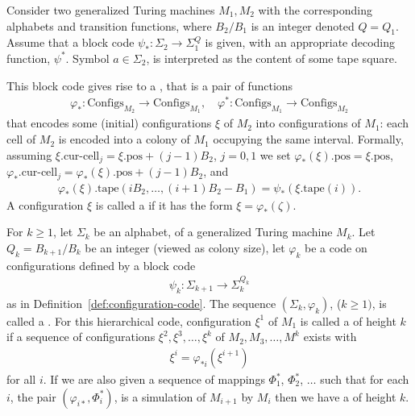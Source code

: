 \documentclass[11pt]{memoir}
\theoremstyle{definition} %
\renewcommand{\ge}{\geq}
\def\B{B}
\newcommand{\Configs}{\mathrm{Configs}}
\newcommand{\pos}{\mathrm{pos}}
\newcommand{\curcell}{\textrm{cur-cell}}
\newcommand{\Q}{Q} %
\newcommand{\tape}{\mathrm{tape}}
\begin{document}
\begin{definition}\label{def:configuration-code}
\begin{sloppypar}
 Consider two generalized Turing machines \( M_{1},M_{2} \) with the corresponding
alphabets and transition functions, where \( \B_{2}/\B_{1} \) is an integer denoted \( \Q=\Q_{1} \).
Assume that a block code
\(
   \psi_{*}:\Sigma_{2}\to\Sigma_{1}^{\Q}
\)
is given, with an appropriate decoding function, \( \psi^{*} \).
Symbol \( a\in\Sigma_{2} \), is interpreted as the content of some tape square.
\end{sloppypar}

This block code gives rise to a , that is a pair of functions
    \begin{align*}
        \varphi_{*} :\Configs_{M_{2}} \to \Configs_{M_{1}},
        \quad
        \varphi^{*}:\Configs_{M_{1}} \to \Configs_{M_{2}}
    \end{align*}
    that encodes some (initial) configurations \( \xi \) of \( M_{2} \) into configurations of \( M_{1} \):
    each cell of \( M_{2} \) is encoded into a colony of \( M_{1} \) occupying the same interval.
    Formally, assuming \( \xi.\curcell_{j}=\xi.\pos+(j-1)\B_{2} \), \( j=0,1 \) 
    we set \( \varphi_{*}(\xi).\pos = \xi.\pos \),
    \( \varphi_{*}.\curcell_{j}= \varphi_{*}(\xi).\pos+(j-1)\B_{2} \),
  and
\begin{align*}
 \varphi_{*}(\xi).\tape(i\B_{2}, \dots, (i+1)\B_{2} - \B_{1}) = \psi_{*}(\xi.\tape(i)).
 \end{align*}
A configuration \( \xi \) is called a  if it has the form \( \xi=\varphi_{*}(\zeta) \).
 \end{definition}


\begin{definition}\label{def:hierarchical-code}
For \( k\ge 1 \), let \( \Sigma_{k} \) be an alphabet, of a generalized Turing machine \( M_{k} \).
Let \( \Q_{k}=\B_{k+1}/\B_{k} \) be an integer (viewed as colony size), let \( \varphi_{k} \)
be a code on configurations defined by a block code
  \begin{align*}
       \psi_{k}: \Sigma_{k+1}\to \Sigma_{k}^{\Q_{k}}
  \end{align*}
as in Definition~\ref{def:configuration-code}.
The sequence \( (\Sigma_{k},\varphi_{k}) \), (\( k\ge 1) \),  is
called a .
For this hierarchical code, configuration \( \xi^{1} \) of \( M_{1} \)
is called a  of height \( k \) if a sequence
of configurations \( \xi^{2},\xi^{3},\dots,\xi^{k} \) of \( M_{2},M_{3},\dots,M^{k} \) exists with
\begin{align*}
 \xi^{i}=\varphi_{*i}(\xi^{i+1})
 \end{align*} 
for all \( i \).
If we are also given a sequence of mappings \( \Phi^{*}_{1} \), \( \Phi^{*}_{2} \), \( \dots \) 
such that for each \( i \), the pair \( (\varphi_{i*},\Phi_{i}^{*}) \),
is a simulation of \( M_{i+1} \) by \( M_{i} \) 
then we have a  of height \( k \).
\end{definition}
\end{document}
